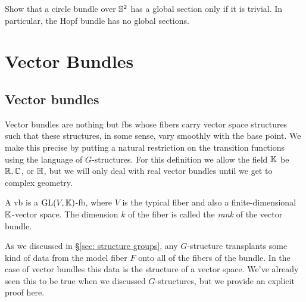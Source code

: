 \begin{xca}
    Show that a circle bundle over $\mathbb{S}^2$ has a global section only if it is trivial. In particular, the Hopf bundle has no global sections.
\end{xca}

\clearpage
\section{Vector Bundles}


\subsection{Vector bundles}

Vector bundles are nothing but \glspl{fb} whose fibers carry vector space structures such that these structures, in some sense, vary smoothly with the base point. We make this precise by putting a natural restriction on the transition functions using the language of $G$-structures. For this definition we allow the field $\mathbb{K}$ be $\mathbb{R},\mathbb{C}$, or $\mathbb{H}$, but we will only deal with real vector bundles until we get to complex geometry.

\begin{defn}
    A \gls{vb} is a $\operatorname{GL}(V,\mathbb{K})$-\gls{fb}, where $V$ is the typical fiber and also a finite-dimensional $\mathbb{K}$-vector space. The dimension $k$ of the fiber is called the \emph{rank} of the vector bundle.
\end{defn}

As we discussed in \S\ref{sec: structure groups}, any $G$-structure transplants some kind of data from the model fiber $F$ onto all of the fibers of the bundle. In the case of vector bundles this data is the structure of a vector space. We've already seen this to be true when we discussed $G$-structures, but we provide an explicit proof here.

